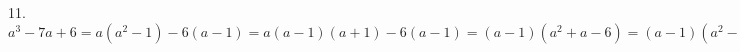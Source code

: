 11. $a^3-7a+6=a(a^2-1)-6(a-1)=a(a-1)(a+1)-6(a-1)=(a-1)(a^2+a-6)=(a-1)(a^2-4+a-2)=(a-1)((a-2)(a+2)+a-2)=(a-1)(a-2)(a+3).$\\
